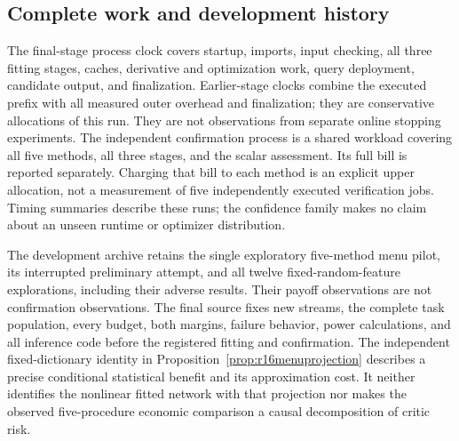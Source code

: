 \subsection{Complete work and development history}
The final-stage process clock covers startup, imports, input checking, all
three fitting stages, caches, derivative and optimization work, query
deployment, candidate output, and finalization. Earlier-stage clocks combine
the executed prefix with all measured outer overhead and finalization; they
are conservative allocations of this run. They are not observations from
separate online stopping experiments. The independent confirmation process
is a shared workload covering all five methods, all three stages, and the
scalar assessment. Its full bill is reported separately. Charging that bill
to each method is an explicit upper allocation, not a measurement of five
independently executed verification jobs. Timing summaries describe these
runs; the confidence family makes no claim about an unseen runtime or
optimizer distribution.

The development archive retains the single exploratory five-method menu
pilot, its interrupted preliminary attempt, and all twelve fixed-random-feature
explorations, including their adverse results. Their payoff observations are
not confirmation observations. The final source fixes new streams, the
complete task population, every budget, both margins, failure behavior,
power calculations, and all inference code before the registered fitting
and confirmation. The independent fixed-dictionary identity in
Proposition~\ref{prop:r16menuprojection} describes a precise conditional
statistical benefit and its approximation cost. It neither identifies the
nonlinear fitted network with that projection nor makes the observed
five-procedure economic comparison a causal decomposition of critic risk.
